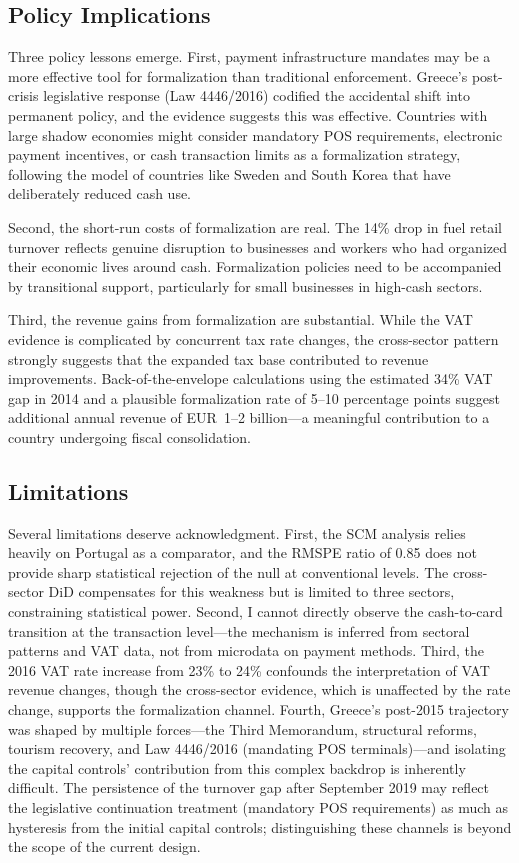 \documentclass[12pt]{article}
\begin{document}
\subsection{Policy Implications}

Three policy lessons emerge. First, payment infrastructure mandates may be a more effective tool for formalization than traditional enforcement. Greece's post-crisis legislative response (Law 4446/2016) codified the accidental shift into permanent policy, and the evidence suggests this was effective. Countries with large shadow economies might consider mandatory POS requirements, electronic payment incentives, or cash transaction limits as a formalization strategy, following the model of countries like Sweden and South Korea that have deliberately reduced cash use.

Second, the short-run costs of formalization are real. The 14\% drop in fuel retail turnover reflects genuine disruption to businesses and workers who had organized their economic lives around cash. Formalization policies need to be accompanied by transitional support, particularly for small businesses in high-cash sectors.

Third, the revenue gains from formalization are substantial. While the VAT evidence is complicated by concurrent tax rate changes, the cross-sector pattern strongly suggests that the expanded tax base contributed to revenue improvements. Back-of-the-envelope calculations using the estimated 34\% VAT gap in 2014 and a plausible formalization rate of 5--10 percentage points suggest additional annual revenue of EUR~1--2 billion---a meaningful contribution to a country undergoing fiscal consolidation.

\subsection{Limitations}

Several limitations deserve acknowledgment. First, the SCM analysis relies heavily on Portugal as a comparator, and the RMSPE ratio of 0.85 does not provide sharp statistical rejection of the null at conventional levels. The cross-sector DiD compensates for this weakness but is limited to three sectors, constraining statistical power. Second, I cannot directly observe the cash-to-card transition at the transaction level---the mechanism is inferred from sectoral patterns and VAT data, not from microdata on payment methods. Third, the 2016 VAT rate increase from 23\% to 24\% confounds the interpretation of VAT revenue changes, though the cross-sector evidence, which is unaffected by the rate change, supports the formalization channel. Fourth, Greece's post-2015 trajectory was shaped by multiple forces---the Third Memorandum, structural reforms, tourism recovery, and Law 4446/2016 (mandating POS terminals)---and isolating the capital controls' contribution from this complex backdrop is inherently difficult. The persistence of the turnover gap after September 2019 may reflect the legislative continuation treatment (mandatory POS requirements) as much as hysteresis from the initial capital controls; distinguishing these channels is beyond the scope of the current design.
\end{document}
